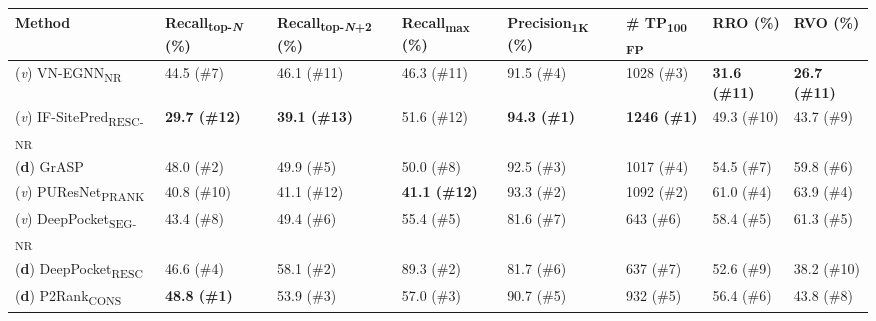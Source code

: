 \begingroup
\captionsetup{belowskip=0pt,aboveskip=9pt} %
\begin{landscape}
\begin{longtable}[c]{|M{33mm}|M{28mm}|M{31mm}|M{26mm}|M{29mm}|M{19mm}|M{18mm}|M{18mm}|}
\hline
\textbf{Method}         & \textbf{Recall\textsubscript{top-\textit{N}}} (\%) & \textbf{Recall\textsubscript{top-\textit{N}+2}} (\%) & \textbf{Recall\textsubscript{max}} (\%) & \textbf{Precision\textsubscript{1K}} (\%) & \textbf{\# TP\textsubscript{100 FP}} & \textbf{RRO} (\%) & \textbf{RVO} (\%) \\ \hline
\endfirsthead
%
\footnotesize{(\textit{v})} VN-EGNN\textsubscript{NR}          & 44.5 (\#7)           & 46.1 (\#11)             & 46.3 (\#11)         & 91.5 (\#4)           & 1028 (\#3)       & \textbf{\textcolor{CBBlue}{31.6 (\#11)}}     & \textbf{\textcolor{CBBlue}{26.7 (\#11)}}     \\ \hline
\footnotesize{(\textit{v})} IF-SitePred\textsubscript{RESC-NR} & \textbf{\textcolor{CBOrange}{29.7 (\#12)}}           & \textbf{\textcolor{CBOrange}{39.1 (\#13)}}             & 51.6 (\#12)           & \textbf{\textcolor{CBBlue}{94.3 (\#1)}}           & \textbf{\textcolor{CBBlue}{1246 (\#1)}}       & 49.3 (\#10)     & 43.7 (\#9)     \\ \hline
\footnotesize{(\textbf{d})} GrASP              & 48.0 (\#2)             & 49.9 (\#5)             & 50.0 (\#8)           & 92.5 (\#3)           & 1017 (\#4)       & 54.5 (\#7)     & 59.8 (\#6)     \\ \hline
\footnotesize{(\textit{v})} PUResNet\textsubscript{PRANK}      & 40.8 (\#10)           & 41.1 (\#12)             & \textbf{\textcolor{CBOrange}{41.1 (\#12)}}         & 93.3 (\#2)           & 1092 (\#2)       & 61.0 (\#4)     & 63.9 (\#4)     \\ \hline
\footnotesize{(\textit{v})} DeepPocket\textsubscript{SEG-NR}   & 43.4 (\#8)          & 49.4 (\#6)            & 55.4 (\#5)        & 81.6 (\#7)          & 643 (\#6)        & 58.4 (\#5)     & 61.3 (\#5)     \\ \hline
\footnotesize{(\textbf{d})} DeepPocket\textsubscript{RESC}     & 46.6 (\#4)           & 58.1 (\#2)            & 89.3 (\#2)        & 81.7 (\#6)          & 637 (\#7)        & 52.6 (\#9)     & 38.2 (\#10)     \\ \hline
\footnotesize{(\textbf{d})} P2Rank\textsubscript{CONS}         & \textbf{\textcolor{CBBlue}{48.8 (\#1)}}           & 53.9 (\#3)             & 57.0 (\#3)           & 90.7 (\#5)           & 932 (\#5)         & 56.4 (\#6)     & 43.8 (\#8)     \\ \hline

\end{longtable}
\end{landscape}
